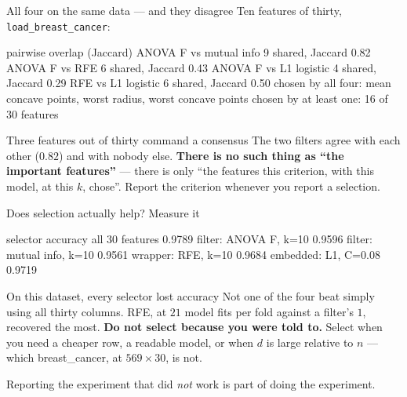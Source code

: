 \documentclass[aspectratio=169]{beamer}
\begin{document}
\begin{frame}[fragile,shrink=8]{All four on the same data --- and they disagree}
Ten features of thirty, \texttt{load\_breast\_cancer}:
\begin{outblk}
pairwise overlap (Jaccard)
   ANOVA F       vs mutual info    9 shared, Jaccard 0.82
   ANOVA F       vs RFE            6 shared, Jaccard 0.43
   ANOVA F       vs L1 logistic    4 shared, Jaccard 0.29
   RFE           vs L1 logistic    6 shared, Jaccard 0.50
chosen by all four: mean concave points, worst radius, worst concave points
chosen by at least one: 16 of 30 features
\end{outblk}
\begin{alertblock}{Three features out of thirty command a consensus}
  \footnotesize The two filters agree with each other ($0.82$) and with
  nobody else. \textbf{There is no such thing as ``the important features''}
  --- there is only ``the features this criterion, with this model, at this
  $k$, chose''. Report the criterion whenever you report a selection.
\end{alertblock}
\end{frame}

\begin{frame}[fragile,shrink=6]{Does selection actually help? Measure it}
\begin{outblk}
selector                   accuracy
all 30 features              0.9789
filter: ANOVA F, k=10        0.9596
filter: mutual info, k=10    0.9561
wrapper: RFE, k=10           0.9684
embedded: L1, C=0.08         0.9719
\end{outblk}
\begin{alertblock}{On this dataset, every selector lost accuracy}
  \footnotesize Not one of the four beat simply using all thirty columns.
  RFE, at $21$ model fits per fold against a filter's $1$, recovered the
  most. \textbf{Do
  not select because you were told to.} Select when you need a cheaper row,
  a readable model, or when $d$ is large relative to $n$ --- which
  breast\_cancer, at $569 \times 30$, is not.
\end{alertblock}
\begin{center}\small
  Reporting the experiment that did \emph{not} work is part of doing the
  experiment.
\end{center}
\end{frame}
\end{document}
